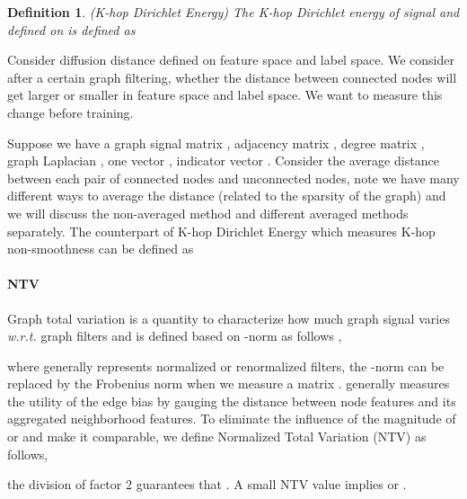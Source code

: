 \documentclass{article}
\newcommand\wrt{\textit{w.r.t.}}
\newcommand{\0}{{\boldsymbol{0}}}
\newcommand{\6}{{\partial}}
\newcommand{\8}{{\infty}}
\newcommand{\4}{{\nabla}}
\newtheorem{definition}{Definition}
\begin{document}
\label{sec:measurement}
\begin{definition}(K-hop Dirichlet Energy) The K-hop Dirichlet energy of signal  and  defined on  is defined as 

\end{definition}
Consider diffusion distance defined on feature space and label space. We consider after a certain graph filtering, whether the distance between connected nodes will get larger or smaller in feature space and label space. We want to measure this change before training.

Suppose we have a graph signal matrix , adjacency matrix , degree matrix , graph Laplacian , one vector , indicator vector . Consider the average distance between each pair of connected nodes and unconnected nodes, note we have many different ways to average the distance (related to the sparsity of the graph) and we will discuss the non-averaged method and different averaged methods separately.
The counterpart of K-hop Dirichlet Energy which measures K-hop non-smoothness can be defined as 



\paragraph{NTV} Graph total variation is a quantity to characterize how much graph signal varies \wrt{} graph filters and is defined based on -norm as follows \cite{chen2015signal,ahmed2017graph},

where  generally represents normalized or renormalized filters, the -norm can be replaced by the Frobenius norm when we measure a matrix .  generally measures the utility of the edge bias by gauging the distance between node features and its aggregated neighborhood features. To eliminate the influence of the magnitude of  or  and make it comparable, we define Normalized Total Variation (NTV) as follows,

the division of factor 2 guarantees that . A small NTV value implies  or .
\end{document}
